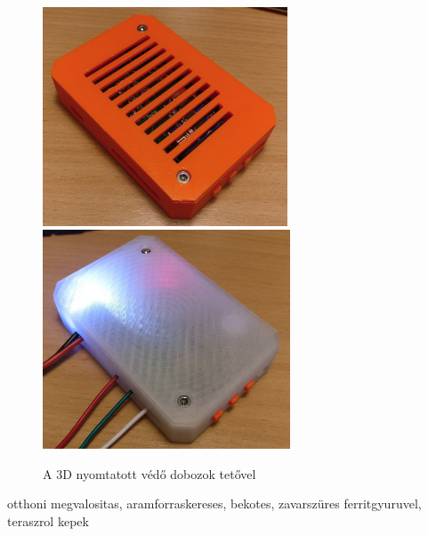 \documentclass[../main.tex]{subfiles}
\begin{document}
            \begin{figure}[h!]
                \centering
                    \includegraphics[height=6.5cm]{resources/pcb_res/printed_case_wtop_ngen}
                    \includegraphics[height=6.5cm]{resources/pcb_res/printed_case_wtop_abs}
                    \caption{A 3D nyomtatott védő dobozok tetővel}
                    \label{fig:printed_cases_2}
            \end{figure}
    
otthoni megvalositas, aramforraskereses, bekotes, zavarszüres ferritgyuruvel, teraszrol kepek\\
\end{document}
